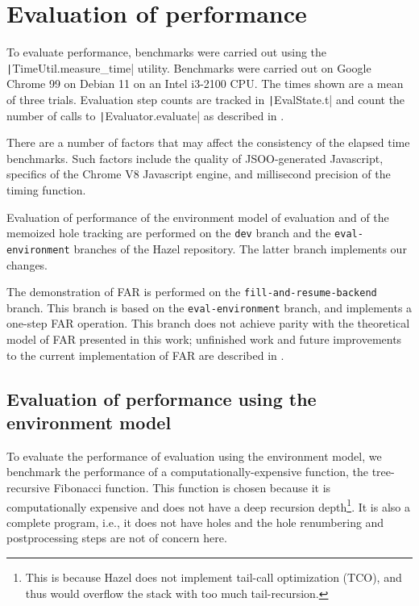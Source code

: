 \chapter{Evaluation of performance}
\label{sec:evaluation}

To evaluate performance, benchmarks were carried out using the \texttt|TimeUtil.measure_time| utility. Benchmarks were carried out on Google Chrome 99 on Debian 11 on an Intel i3-2100 CPU. The times shown are a mean of three trials. Evaluation step counts are tracked in \texttt|EvalState.t| and count the number of calls to \texttt|Evaluator.evaluate| as described in .

There are a number of factors that may affect the consistency of the elapsed time benchmarks. Such factors include the quality of JSOO-generated Javascript, specifics of the Chrome V8 Javascript engine, and millisecond precision of the timing function.

Evaluation of performance of the environment model of evaluation and of the memoized hole tracking are performed on the \texttt{dev} branch and the \texttt{eval-environment} branches of the Hazel repository. The latter branch implements our changes.

The demonstration of FAR is performed on the \texttt{fill-and-resume-backend} branch. This branch is based on the \texttt{eval-environment} branch, and implements a one-step FAR operation. This branch does not achieve parity with the theoretical model of FAR presented in this work; unfinished work and future improvements to the current implementation of FAR are described in .

\section{Evaluation of performance using the environment model}
\label{sec:evaluation-evalenv}

To evaluate the performance of evaluation using the environment model, we benchmark the performance of a computationally-expensive function, the tree-recursive Fibonacci function. This function is chosen because it is computationally expensive and does not have a deep recursion depth\footnote{This is because Hazel does not implement tail-call optimization (TCO), and thus would overflow the stack with too much tail-recursion.}. It is also a complete program, i.e., it does not have holes and the hole renumbering and postprocessing steps are not of concern here.

